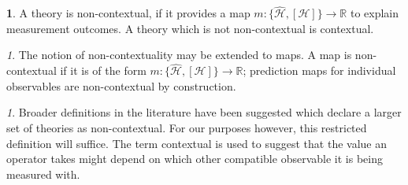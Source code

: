 \documentclass[british,aps,prl,superscriptaddress,nofootinbib,times,reprint]{revtex4-1}
\theoremstyle{plain}
\theoremstyle{definition}
\newtheorem{defn}[thm]{\protect\definitionname}
\theoremstyle{remark}
\newtheorem{rem}[thm]{\protect\remarkname}
\theoremstyle{plain}
\theoremstyle{plain}
\theoremstyle{plain}
\theoremstyle{definition}
\theoremstyle{definition}
\providecommand{\definitionname}{Definition}
\providecommand{\remarkname}{Remark}
\begin{document}
\begin{defn} A theory is non-contextual, if it
provides a map $m: \{
\hat{\mathcal{H}},[\mathcal{H}] \} \to\mathbb{R}$
to explain measurement outcomes. A theory which is
not non-contextual is contextual.\end{defn}


\begin{rem} The notion of non-contextuality may be
extended to maps. A map is non-contextual if it is
of the form $m: \{ \hat{\mathcal{H}},[\mathcal{H}]
\} \to\mathbb{R}$; prediction maps for individual
observables are non-contextual by construction.  
\end{rem}
\begin{rem}
Broader definitions in the literature have been
suggested which declare a larger set of theories
as non-contextual. For our purposes however, this
restricted definition will suffice. The term
contextual is used to suggest that the value an
operator takes might depend on which other
compatible observable it is being  measured with.
\end{rem}
\end{document}
